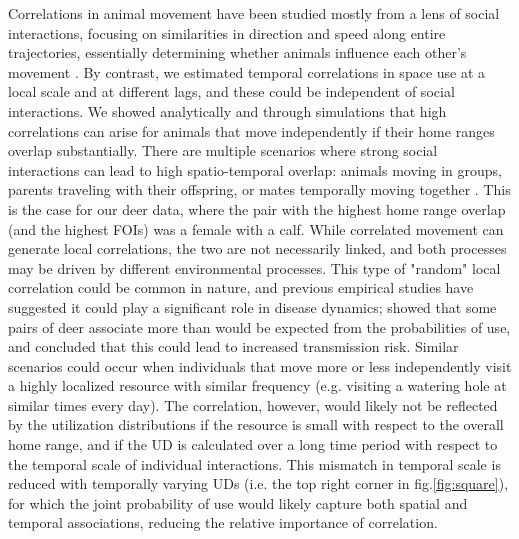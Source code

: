 \documentclass[letterpaper]{article}
\begin{document}
Correlations in animal movement have been studied mostly from a lens of social interactions, focusing on similarities in direction and speed along entire trajectories, essentially determining whether animals influence each other's movement \citep{Scharf2018}. 
By contrast, we estimated temporal correlations in space use at a local scale and at different lags, and these could be independent of social interactions. We showed analytically and through simulations that high correlations can arise for animals that move independently if their home ranges overlap substantially. There are multiple scenarios where strong social interactions can lead to high spatio-temporal overlap: animals moving in groups, parents traveling with their offspring, or mates temporally moving together \citep{Yang2021}. This is the case for our deer data, where the pair with the highest home range overlap (and the highest FOIs) was a female with a calf. While correlated movement can generate local correlations, the two are not necessarily linked, and both processes may be driven by different environmental processes.
This type of "random" local correlation could be common in nature, and previous empirical studies have suggested it could play a significant role in disease dynamics; \citet{} showed that some pairs of deer associate more than would be expected from the probabilities of use, and concluded that this could lead to increased transmission risk. Similar scenarios could occur when individuals that move more or less independently visit a highly localized resource with similar frequency (e.g. visiting a watering hole at similar times every day)\citep{Vanderwal2017}. The correlation, however, would likely not be reflected by the utilization distributions if the resource is small with respect to the overall home range, and if the UD is calculated over a long time period with respect to the temporal scale of individual interactions. 
This mismatch in temporal scale is reduced with temporally varying UDs (i.e. the top right corner in fig.\ref{fig:square}), for which the joint probability of use would likely capture both spatial and temporal associations, reducing the relative importance of  correlation. 

\end{document}
